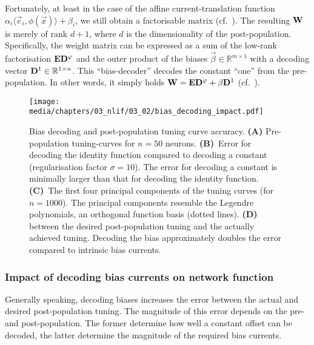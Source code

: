 Fortunately, at least in the case of the affine current-translation function $\alpha_i \langle \vec e_i, \phi(\vec x) \rangle + \beta_i$, we still obtain a factorisable matrix (cf.~).
The resulting $\mathbf{W}$ is merely of rank $d + 1$, where $d$ is the dimensionality of the post-population.
Specifically, the weight matrix can be expressed as a sum of the low-rank factorisation $\mathbf{E} \mathbf{D}^\varphi$ and the outer product of the biases $\vec \beta \in \mathbb{R}^{m \times 1}$ with a decoding vector $\mathbf{D}^1 \in \mathbb{R}^{1 \times n}$.
This \enquote{bias-decoder} decodes the constant \enquote{one} from the pre-population.
In other words, it simply holds $\mathbf{W} = \mathbf{E} \mathbf{D}^\varphi + \mathbf{\beta} \mathbf{D}^1$ (cf.~\cite[Chapter~4]{stockel2017point,duggins2017incorporating}).

\begin{figure}
	\texttt{[image: media/chapters/03\_nlif/03\_02/bias\_decoding\_impact.pdf]}%
	{\label{fig:bias_decoding_impact_a}}%
	{\label{fig:bias_decoding_impact_b}}%
	{\label{fig:bias_decoding_impact_c}}%
	{\label{fig:bias_decoding_impact_d}}%
	\caption[Bias decoding and post-population tuning curve accuracy]{Bias decoding and post-population tuning curve accuracy. \textbf{(A)} Pre-population tuning-curves for $n = 50$ \LIF neurons.
	\textbf{(B)}~Error for decoding the identity function compared to decoding a constant (regularisation factor $\sigma = 10$). The error for decoding a constant is minimally larger than that for decoding the identity function.
	\textbf{(C)}~The first four principal components of the tuning curves (for $n = 1000$).
	The principal components resemble the Legendre polynomials, an orthogonal function basis (dotted lines).
	\textbf{(D)} \RMSE between the desired post-population tuning and the actually achieved tuning. Decoding the bias approximately doubles the error compared to intrinsic bias currents.}
\end{figure}

\subsubsection{Impact of decoding bias currents on network function}
Generally speaking, decoding biases increases the error between the actual and desired post-population tuning.
The magnitude of this error depends on the pre- and post-population. 
The former determine how well a constant offset can be decoded, the latter determine the magnitude of the required bias currents.


